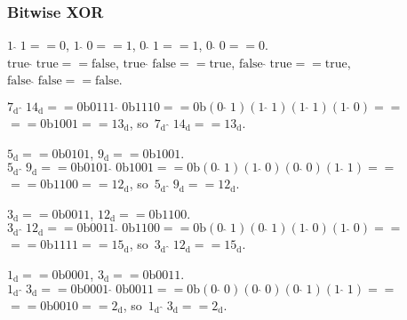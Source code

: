 \documentclass[10pt,t]{beamer}
\begin{document}
\begin{frame}
  \frametitle{Bitwise XOR}


  $1 \; \hat{} \; 1 == 0$, $1 \; \hat{} \; 0 == 1$,
  $0 \; \hat{} \; 1 == 1$, $0 \; \hat{} \; 0 == 0$. \\
  $\text{true} \; \hat{} \; \text{true} == \text{false}$,
  $\text{true} \; \hat{} \; \text{false} == \text{true}$,
  $\text{false} \; \hat{} \; \text{true} == \text{true}$, \\
  $\text{false} \; \hat{} \; \text{false} == \text{false}$.

  $7_{ \text{d} } \; \hat{} \; 14_{ \text{d} } == 0\text{b}0111 \; \hat{} \;
  0\text{b}1110 ==
  0\text{b}( 0 \; \hat{} \; 1 )( 1 \; \hat{} \; 1 )( 1 \; \hat{} \; 1 )
  ( 1 \; \hat{} \; 0 ) ==$ \\
  $== 0\text{b}1001 == 13_{ \text{d} }$,
  so~$7_{ \text{d} } \; \hat{} \; 14_{ \text{d} } == 13_{ \text{d} }$.

  $5_{ \text{d} } == 0\text{b}0101$, $9_{ \text{d} } == 0\text{b}1001$. \\
  $5_{ \text{d} } \; \hat{} \; 9_{ \text{d} } == 0\text{b}0101 \; \hat{} \;
  0\text{b}1001 == 0\text{b}( 0 \; \hat{} \; 1 )( 1 \; \hat{} \; 0 )
  ( 0 \; \hat{} \; 0 )( 1 \; \hat{} \; 1 ) ==$ \\
  $== 0\text{b}1100 == 12_{ \text{d} }$,
  so~$5_{ \text{d} } \; \hat{} \; 9_{ \text{d} } == 12_{ \text{d} }$.

  $3_{ \text{d} } == 0\text{b}0011$, $12_{ \text{d} } == 0\text{b}1100$. \\
  $3_{ \text{d} } \; \hat{} \; 12_{ \text{d} } == 0\text{b}0011 \; \hat{} \;
  0\text{b}1100 == 0\text{b}( 0 \; \hat{} \; 1 )( 0 \; \hat{} \; 1 )
  ( 1 \; \hat{} \; 0 )( 1 \; \hat{} \; 0 ) ==$ \\
  $== 0\text{b}1111 == 15_{ \text{d} }$,
  so~$3_{ \text{d} } \; \hat{} \; 12_{ \text{d} } == 15_{ \text{d} }$.

  $1_{ \text{d} } == 0\text{b}0001$, $3_{ \text{d} } == 0\text{b}0011$. \\
  $1_{ \text{d} } \; \hat{} \; 3_{ \text{d} } == 0\text{b}0001 \; \hat{} \;
  0\text{b}0011 == 0\text{b}( 0 \; \hat{} \; 0 )( 0 \; \hat{} \; 0 )
  ( 0 \; \hat{} \; 1 )( 1 \; \hat{} \; 1 ) ==$ \\
  $== 0\text{b}0010 == 2_{ \text{d} }$,
  so~$1_{ \text{d} } \; \hat{} \; 3_{ \text{d} } == 2_{ \text{d} }$.


\end{frame}
\end{document}
